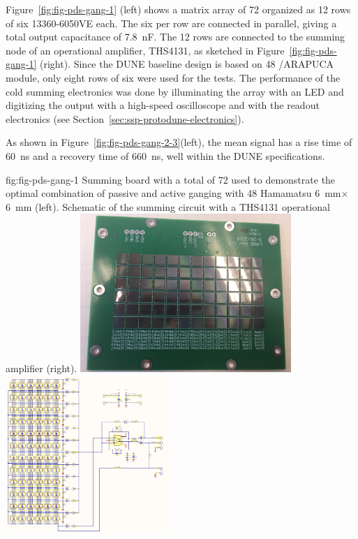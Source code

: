 Figure~\ref{fig:fig-pds-gang-1} (left) shows a matrix array of 72  organized as 12 rows of six  13360-6050VE  each. 
The six  per row are connected in parallel, giving a total output capacitance of \SI{7.8}{nF}. The 12 rows are connected to the summing node of an operational amplifier, THS4131, as sketched in Figure~\ref{fig:fig-pds-gang-1} (right). 
Since the DUNE baseline design is based on 48 /ARAPUCA module, only eight rows of six were used for the tests. 
The performance of the cold summing electronics was done by illuminating the  array with an LED and digitizing the output with a high-speed oscilloscope and with the  readout electronics (see Section~\ref{sec:ssp-protodune-electronics}).

As shown in Figure~\ref{fig:fig-pds-gang-2-3}(left), the mean signal has a rise time of \SI{60}{ns} and a recovery time of \SI{660}{ns}, well within the DUNE  specifications.

\begin{dunefigure}
 {fig:fig-pds-gang-1}
 {Summing board with a total of 72  used to demonstrate the optimal combination of passive and active ganging with 48 Hamamatsu \SI{6}{mm}$\times$\SI{6}{mm}  (left).  Schematic of the summing circuit with a THS4131 operational amplifier (right).}
\includegraphics[height=6cm]{graphics/pds_gang_fig1.jpg}
\includegraphics[height=6cm]{graphics/pds_gang_fig2.png}
\end{dunefigure}


